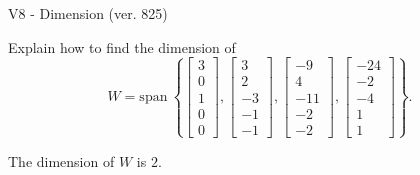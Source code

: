 \begin{exercise}
  \begin{exerciseTitle}V8 - Dimension (ver. 825)\end{exerciseTitle}
  \begin{exerciseStatement}
    Explain how to find the dimension of 
\[W=\mathrm{span}\ \left\{\left[\begin{array}{r}
3 \\
0 \\
1 \\
0 \\
0
\end{array}\right] , \left[\begin{array}{r}
3 \\
2 \\
-3 \\
-1 \\
-1
\end{array}\right] , \left[\begin{array}{r}
-9 \\
4 \\
-11 \\
-2 \\
-2
\end{array}\right] , \left[\begin{array}{r}
-24 \\
-2 \\
-4 \\
1 \\
1
\end{array}\right]\right\}.\]



  \end{exerciseStatement}
  \begin{exerciseAnswer}
   The dimension of \(W\) is  \(2\).
  


  \end{exerciseAnswer}
\end{exercise}